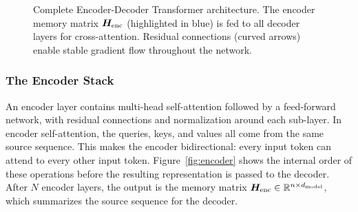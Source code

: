\begin{figure}[H]
\begin{tikzpicture}[scale=1.2, transform shape]
  \end{tikzpicture}
  \caption{Complete Encoder-Decoder Transformer architecture. The encoder memory matrix $\bm{H}_{\text{enc}}$ (highlighted in blue) is fed to all decoder layers for cross-attention. Residual connections (curved arrows) enable stable gradient flow throughout the network.}
  \label{fig:transformer-architecture}
\end{figure}

\subsubsection{The Encoder Stack}

An encoder layer contains multi-head self-attention followed by a feed-forward network, with residual connections and normalization around each sub-layer. In encoder self-attention, the queries, keys, and values all come from the same source sequence. This makes the encoder bidirectional: every input token can attend to every other input token. Figure~\ref{fig:encoder} shows the internal order of these operations before the resulting representation is passed to the decoder. After $N$ encoder layers, the output is the memory matrix $\bm{H}_{\text{enc}} \in \mathbb{R}^{n \times d_{\text{model}}}$, which summarizes the source sequence for the decoder.

